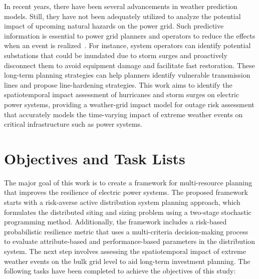 \documentclass[hidelinks, 12pt]{article}
\begin{document}
In recent years, there have been several advancements in weather prediction models. Still, they have not been adequately utilized to analyze the potential impact of upcoming natural hazards on the power grid. Such predictive information is essential to power grid planners and operators to reduce the effects when an event is realized~\cite{9942328, 9810633}. For instance, system operators can identify potential substations that could be inundated due to storm surges and proactively disconnect them to avoid equipment damage and facilitate fast restoration. These long-term planning strategies can help planners identify vulnerable transmission lines and propose line-hardening strategies. This work aims to identify the spatiotemporal impact assessment of hurricanes and storm surges on electric power systems, providing a weather-grid impact model for outage risk assessment that accurately models the time-varying impact of extreme weather events on critical infrastructure such as power systems. 


\section{Objectives and Task Lists}
The major goal of this work is to create a framework for multi-resource planning that improves the resilience of electric power systems. The proposed framework starts with a risk-averse active distribution system planning approach, which formulates the distributed siting and sizing problem using a two-stage stochastic programming method. Additionally, the framework includes a risk-based probabilistic resilience metric that uses a multi-criteria decision-making process to evaluate attribute-based and performance-based parameters in the distribution system. The next step involves assessing the spatiotemporal impact of extreme weather events on the bulk grid level to aid long-term investment planning. The following tasks have been completed to achieve the objectives of this study: 
\end{document}
